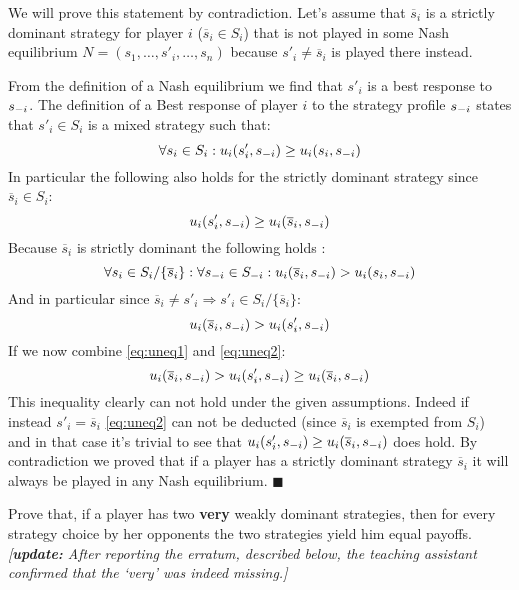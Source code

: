 \documentclass[../main.tex]{subfiles}
\begin{document}
\begin{solution}
	We will prove this statement by contradiction.
	Let's assume that $\overline{s}_i$ is a strictly dominant strategy for player $i$ ($\overline{s}_i \in S_i$) that is not played in some Nash equilibrium $N = (s_1,\ldots,s'_i,\ldots,s_n)$ because $s'_i \neq \overline{s}_i$ is played there instead.

	From the definition of a Nash equilibrium  we find that $s'_i$ is a best response to $s_{\--i}$.
	The definition of a Best response of player $i$ to the strategy profile $s_{\--i}$ states that $s'_i \in S_i$ is a mixed strategy such that:
	\begin{equation}
		\label{eq:bestr}
		\forall s_i \in S_i : u_i(s'_i,s_{\--i}) \geq u_i(s_i,s_{\--i})
	\end{equation}
	In particular the following also holds for the strictly dominant strategy since $\overline{s}_i \in S_i$:
	\begin{equation}
		\label{eq:uneq1}
		u_i(s'_i,s_{\--i}) \geq u_i(\overline{s}_i,s_{\--i})
	\end{equation}
	Because $\overline{s}_i$ is strictly dominant the following holds :
	\begin{equation}
		\forall s_i \in S_i/\{\overline{s}_i\}: \forall s_{\--i} \in S_{\--i} : u_i(\overline{s}_i,s_{\--i}) > u_i(s_i,s_{\--i})
	\end{equation}
	And in particular since $\overline{s}_i \neq s'_i \Rightarrow s'_i \in S_i/\{\overline{s}_i\}$:
	\begin{equation}
		\label{eq:uneq2}
		 u_i(\overline{s}_i,s_{\--i}) > u_i(s'_i,s_{\--i})
	\end{equation}
	If we now combine \autoref{eq:uneq1} and \autoref{eq:uneq2}:
	\begin{equation}
		 u_i(\overline{s}_i,s_{\--i}) > u_i(s'_i,s_{\--i}) \geq u_i(\overline{s}_i,s_{\--i})
	\end{equation}
	This inequality clearly can not hold under the given assumptions.
	Indeed if instead $s'_i = \overline{s}_i$ \autoref{eq:uneq2} can not be deducted (since $\overline{s}_i$ is exempted from $S_i$) and in that case it's trivial to see that $u_i(s'_i,s_{\--i}) \geq u_i(\overline{s}_i,s_{\--i})$ does hold.
	By contradiction we proved that if a player has a strictly dominant strategy $\overline{s}_i$ it will always be played in any Nash equilibrium. $\blacksquare$ 
\end{solution}

\begin{question}
	Prove that, if a player has two \textbf{very} weakly dominant strategies, then for every strategy choice by her opponents the two strategies yield him equal payoffs.
	\textit{[\textbf{update:} After reporting the erratum, described below, the teaching assistant confirmed that the `very' was indeed missing.]}
\end{question}
\end{document}
